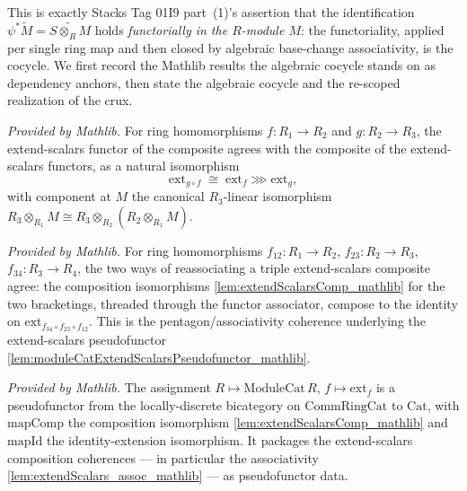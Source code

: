 This is exactly Stacks Tag 01I9 part~(1)'s assertion that the identification
\(\psi^{*}\widetilde M = \widetilde{S\otimes_R M}\) holds \emph{functorially in the \(R\)-module
\(M\)}: the functoriality, applied per single ring map and then closed by algebraic base-change
associativity, is the cocycle. We first record the Mathlib results the algebraic cocycle stands on
as dependency anchors, then state the algebraic cocycle and the re-scoped realization of the crux.

\begin{lemma}
  \label{lem:extendScalarsComp_mathlib}
  \mathlibok
  \textit{Provided by Mathlib.}
  For ring homomorphisms \(f : R_1 \to R_2\) and \(g : R_2 \to R_3\), the extend-scalars functor of
  the composite agrees with the composite of the extend-scalars functors, as a natural isomorphism
  \[
    \mathrm{ext}_{g \circ f} \;\cong\; \mathrm{ext}_f \ggg \mathrm{ext}_g,
  \]
  with component at \(M\) the canonical \(R_3\)-linear isomorphism
  \(R_3 \otimes_{R_1} M \cong R_3 \otimes_{R_2} (R_2 \otimes_{R_1} M)\).
\end{lemma}

\begin{lemma}
  \label{lem:extendScalars_assoc_mathlib}
  \mathlibok
  \textit{Provided by Mathlib.}
  For ring homomorphisms \(f_{12} : R_1 \to R_2\), \(f_{23} : R_2 \to R_3\),
  \(f_{34} : R_3 \to R_4\), the two ways of reassociating a triple extend-scalars composite agree:
  the composition isomorphisms \cref{lem:extendScalarsComp_mathlib} for the two bracketings, threaded
  through the functor associator, compose to the identity on \(\mathrm{ext}_{f_{34}\circ f_{23}\circ
  f_{12}}\). This is the pentagon/associativity coherence underlying the extend-scalars pseudofunctor
  \cref{lem:moduleCatExtendScalarsPseudofunctor_mathlib}.
\end{lemma}

\begin{lemma}
  \label{lem:moduleCatExtendScalarsPseudofunctor_mathlib}
  \mathlibok
  \textit{Provided by Mathlib.}
  The assignment \(R \mapsto \mathrm{ModuleCat}\,R\), \(f \mapsto \mathrm{ext}_f\) is a pseudofunctor
  from the locally-discrete bicategory on \(\mathrm{CommRingCat}\) to \(\mathrm{Cat}\), with
  \(\mathrm{mapComp}\) the composition isomorphism \cref{lem:extendScalarsComp_mathlib} and
  \(\mathrm{mapId}\) the identity-extension isomorphism. It packages the extend-scalars composition
  coherences — in particular the associativity \cref{lem:extendScalars_assoc_mathlib} — as
  pseudofunctor data.
\end{lemma}

